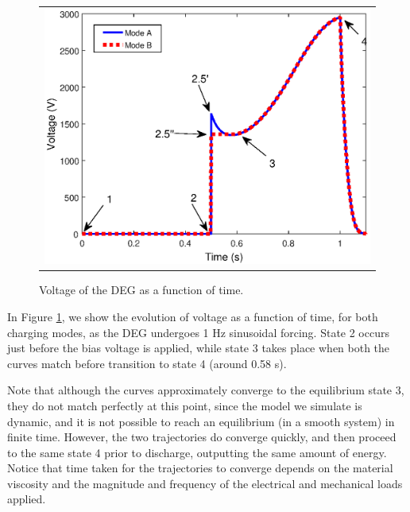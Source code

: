    \begin{figure}[htb]
   \begin{center}
   \begin{tabular}{c} %
   \includegraphics[scale=0.8]{fig02/Fig4_unit.eps}
   \end{tabular}
   \end{center}
   \caption[example] 
   { \label{fig:Cycle txV} 
Voltage of the DEG as a function of time.}
   \end{figure}  



In Figure \ref{fig:Cycle txV}, we show the evolution of voltage as a function of time, for both charging modes, as the DEG undergoes 1 Hz sinusoidal forcing. State 2 occurs just before the bias voltage is applied, while state 3 takes place when both the curves match before transition to state 4 (around 0.58 s). 

Note that although the curves approximately converge to the equilibrium state 3, they do not match perfectly at this point, since the model we simulate is dynamic, and it is not possible to reach an equilibrium (in a smooth system) in finite time. However, the two trajectories do converge quickly, and then proceed to the same state 4 prior to discharge, outputting the same amount of energy. Notice that time taken for the trajectories to converge depends on the material viscosity and the magnitude and frequency of the electrical and mechanical loads applied.


